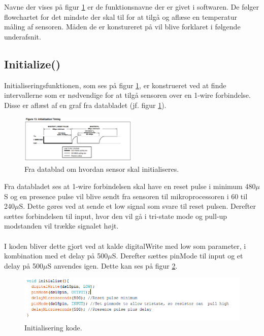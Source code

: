Navne der vises på figur \ref{sensor_kom} er de funktionsnavne der er givet i softwaren. De følger flowchartet for det mindste der skal til for at tilgå og aflæse en temperatur måling af sensoren. Måden de er konstureret på vil blive forklaret i følgende underafsnit.

\newpage
\subsection{Initialize()}
Initialiseringsfunktionen, som ses på figur \ref{sensor_kom}, er konstrueret ved at finde intervallerne som er nødvendige for at tilgå sensoren over en 1-wire forbindelse. Disse er aflæst af en graf fra databladet (jf. figur \ref{sensor_kom}).




\begin{figure}[h!]
  \centering
  \includegraphics[width=0.5\textwidth]{figures/Initialization_timing.png}
  \caption{Fra datablad om hvordan sensor skal initialiseres.}
  \label{sensor_kom}
\end{figure}

Fra databladet ses at 1-wire forbindelsen skal have en reset pulse i minimum 480$\mu$S og en presence pulse vil blive sendt fra sensoren til mikroprocessoren i 60 til 240$\mu$S. Dette gøres ved at sende et low signal som svare til reset pulsen. Derefter sættes forbindelsen til input, hvor den vil gå i tri-state mode og pull-up modstanden vil trække signalet højt. 
\\
\\
I koden bliver dette gjort ved at kalde digitalWrite med low som parameter, i kombination med et delay på 500$\mu$S. Derefter sættes pinMode til input og et delay på 500$\mu$S anvendes igen. Dette kan ses på figur \ref{sensor_kode}.

\begin{figure}[h!]
  \centering
  \includegraphics[width=1\textwidth]{figures/Init.png}
  \caption{Initialisering kode.}
  \label{sensor_kode}
\end{figure}

